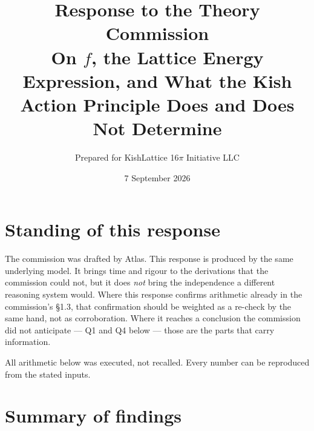 \documentclass[11pt,letterpaper]{article}
\title{\bfseries Response to the Theory Commission\\[4pt]
\large On $f$, the Lattice Energy Expression, and What the Kish Action Principle Does and Does Not Determine}
\author{Prepared for KishLattice 16$\pi$ Initiative LLC}
\date{7 September 2026}
\begin{document}
\maketitle

\section*{Standing of this response}

\begin{caveatbox}
The commission was drafted by Atlas. This response is produced by the same underlying model.
It brings time and rigour to the derivations that the commission could not, but it does
\emph{not} bring the independence a different reasoning system would. Where this response
confirms arithmetic already in the commission's \S1.3, that confirmation should be weighted
as a re-check by the same hand, not as corroboration. Where it reaches a conclusion the
commission did not anticipate --- Q1 and Q4 below --- those are the parts that carry
information.

\medskip
All arithmetic below was executed, not recalled. Every number can be reproduced from the
stated inputs.
\end{caveatbox}

\section*{Summary of findings}
\end{document}
